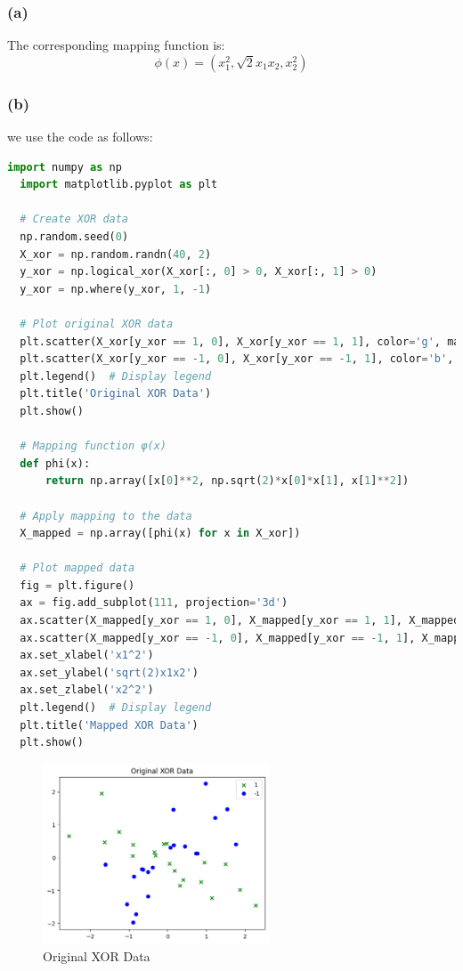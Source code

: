 \documentclass[oneside,solution]{seu-ml-assign}
\begin{document}
\subsubsection{(a)}

The corresponding mapping function is:
\begin{equation}\phi(x)=(x_1^2,\sqrt{2}x_1x_2,x_2^2)\end{equation}


\subsubsection{(b)}
we use the code as follows:
\begin{lstlisting}[language=Python]
  import numpy as np
  import matplotlib.pyplot as plt
  
  # Create XOR data
  np.random.seed(0)
  X_xor = np.random.randn(40, 2)
  y_xor = np.logical_xor(X_xor[:, 0] > 0, X_xor[:, 1] > 0)
  y_xor = np.where(y_xor, 1, -1)
  
  # Plot original XOR data
  plt.scatter(X_xor[y_xor == 1, 0], X_xor[y_xor == 1, 1], color='g', marker='x', label='1')
  plt.scatter(X_xor[y_xor == -1, 0], X_xor[y_xor == -1, 1], color='b', marker='o', label='-1')
  plt.legend()  # Display legend
  plt.title('Original XOR Data')
  plt.show()
  
  # Mapping function φ(x)
  def phi(x):
      return np.array([x[0]**2, np.sqrt(2)*x[0]*x[1], x[1]**2])
  
  # Apply mapping to the data
  X_mapped = np.array([phi(x) for x in X_xor])
  
  # Plot mapped data
  fig = plt.figure()
  ax = fig.add_subplot(111, projection='3d')
  ax.scatter(X_mapped[y_xor == 1, 0], X_mapped[y_xor == 1, 1], X_mapped[y_xor == 1, 2], color='g', marker='x', label='1')
  ax.scatter(X_mapped[y_xor == -1, 0], X_mapped[y_xor == -1, 1], X_mapped[y_xor == -1, 2], color='b', marker='o', label='-1')
  ax.set_xlabel('x1^2')
  ax.set_ylabel('sqrt(2)x1x2')
  ax.set_zlabel('x2^2')
  plt.legend()  # Display legend
  plt.title('Mapped XOR Data')
  plt.show()  
\end{lstlisting}
\begin{figure}[htbp]
  \centering
  \includegraphics[width=0.6\textwidth]{1.2.b1.png}
  \caption[Original XOR Data]{Original XOR Data}
  \label{1.2.b1}
\end{figure}
\end{document}
